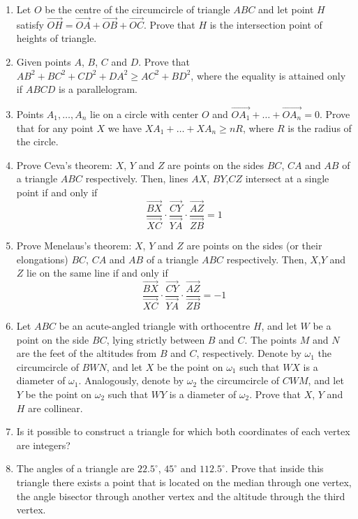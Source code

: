 \documentclass{article}
\begin{document}
\begin{enumerate}
\item %
Let $O$ be the centre of the circumcircle of triangle $ABC$ and let point $H$
satisfy $\overrightarrow{OH} = \overrightarrow{OA} + \overrightarrow{OB} + \overrightarrow{OC}$. Prove that $H$ is the intersection point of heights of triangle.

\item %
Given points $A$, $B$, $C$ and $D$. Prove that $AB^2 + BC^2 + CD^2 + DA^2 \geq AC^2 + BD^2$,
where the equality is attained only if $ABCD$ is a parallelogram.

\item %
Points $A_1,\dots, A_n$ lie on a circle with center $O$ and $\overrightarrow{OA_1} +\dots+ \overrightarrow{OA_n}=0$. Prove
that for any point $X$ we have $XA_1 + \dots + XA_n \geq nR$, where $R$ is the radius of the circle.



\item 
Prove Ceva's theorem: $X$, $Y$ and $Z$ are points on the sides $BC$, $CA$ and $AB$ of a triangle $ABC$ respectively. Then, lines $AX$, $BY$,$CZ$ intersect at a single point if and only if
$$\frac{\overrightarrow{BX}}{\overrightarrow{XC}} \cdot \frac{\overrightarrow{CY}}{\overrightarrow{YA}} \cdot \frac{\overrightarrow{AZ}}{\overrightarrow{ZB}} = 1$$

\item 
Prove Menelaus's theorem: $X$, $Y$ and $Z$ are points on the sides (or their elongations) $BC$, $CA$ and $AB$ of a triangle $ABC$ respectively. Then, $X$,$Y$ and $Z$ lie on the same line if and only if
$$\frac{\overrightarrow{BX}}{\overrightarrow{XC}} \cdot \frac{\overrightarrow{CY}}{\overrightarrow{YA}} \cdot \frac{\overrightarrow{AZ}}{\overrightarrow{ZB}} = -1$$


\item %
Let $ABC$ be an acute-angled triangle with orthocentre $H$, and let $W$ be a point on the side $BC$, lying strictly between $B$ and $C$. The points $M$ and $N$ are the feet of the altitudes from $B$ and $C$, respectively. Denote by $\omega_1$ the circumcircle of $BWN$, and let $X$ be the point on $\omega_1$ such that $WX$ is a diameter of $\omega_1$. Analogously, denote by $\omega_2$ the circumcircle of $CWM$, and let $Y$ be the point on $\omega_2$ such that $WY$ is a diameter of $\omega_2$. Prove that $X$, $Y$ and $H$ are collinear.

\item 
Is it possible to construct a triangle for which both coordinates of each vertex are integers?

\item %
The angles of a triangle are $22.5^\circ$, $45^\circ$ and $112.5^\circ$. Prove that inside this triangle there exists a point that is located on the median through one vertex, the angle bisector through another vertex and the altitude through the third vertex.



\end{enumerate}
\end{document}

